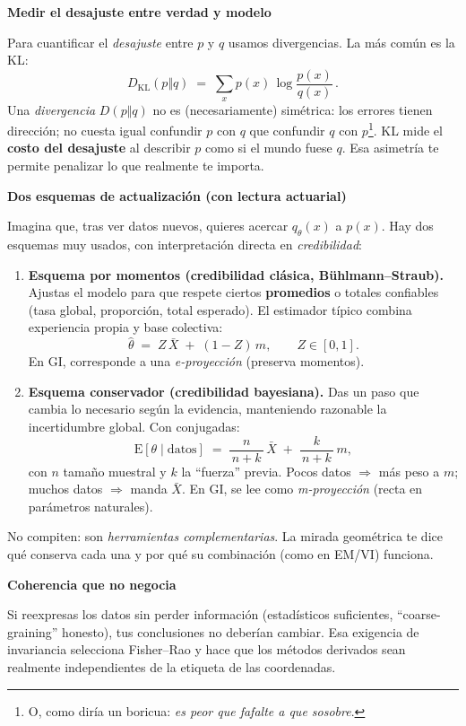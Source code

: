 \documentclass[12pt,letterpaper]{book}
\begin{document}
\textbf{Medir el desajuste entre verdad y modelo}

Para cuantificar el \emph{desajuste} entre $p$ y $q$ usamos divergencias. La más común es la KL:
\[
D_{\mathrm{KL}}(p\Vert q)\;=\;\sum_x p(x)\,\log\frac{p(x)}{q(x)}\,.
\]
Una \emph{divergencia} $D(p\Vert q)$ no es (necesariamente) simétrica: los errores tienen dirección; no cuesta igual confundir $p$ con $q$ que confundir $q$ con $p$\footnote{O, como diría un boricua: \emph{es peor que fafalte a que sosobre}.}. KL mide el \textbf{costo del desajuste} al describir $p$ como si el mundo fuese $q$. Esa asimetría te permite penalizar lo que realmente te importa.

\textbf{Dos esquemas de actualización (con lectura actuarial)}

Imagina que, tras ver datos nuevos, quieres acercar $q_\theta(x)$ a $p(x)$. Hay dos esquemas muy usados, con interpretación directa en \emph{credibilidad}:

\begin{enumerate}
	\item \textbf{Esquema por momentos (credibilidad clásica, B{\"u}hlmann--Straub).}
	Ajustas el modelo para que respete ciertos \textbf{promedios} o totales confiables (tasa global, proporción, total esperado). El estimador típico combina experiencia propia y base colectiva:
	\[
	\hat{\theta}\;=\;Z\,\bar{X}\;+\;(1-Z)\,m,\qquad Z\in[0,1].
	\]
	En GI, corresponde a una \emph{e-proyección} (preserva momentos).
	
	\item \textbf{Esquema conservador (credibilidad bayesiana).}
	Das un paso que cambia lo necesario según la evidencia, manteniendo razonable la incertidumbre global. Con conjugadas:
	\[
	\mathrm{E}[\theta\mid \mathrm{datos}]\;=\;\frac{n}{\,n+k\,}\,\bar{X}\;+\;\frac{k}{\,n+k\,}\,m,
	\]
	con $n$ tamaño muestral y $k$ la “fuerza” previa. Pocos datos $\Rightarrow$ más peso a $m$; muchos datos $\Rightarrow$ manda $\bar{X}$. En GI, se lee como \emph{m-proyección} (recta en parámetros naturales).
\end{enumerate}

No compiten: son \emph{herramientas complementarias}. La mirada geométrica te dice qué conserva cada una y por qué su combinación (como en EM/VI) funciona.

\textbf{Coherencia que no negocia}

Si reexpresas los datos sin perder información (estadísticos suficientes, “coarse-graining” honesto), tus conclusiones no deberían cambiar. Esa exigencia de invariancia selecciona Fisher--Rao y hace que los métodos derivados sean realmente independientes de la etiqueta de las coordenadas.
\end{document}

